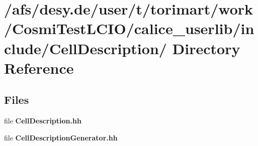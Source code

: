 \section{/afs/desy.de/user/t/torimart/work/CosmiTestLCIO/calice\_\-userlib/include/CellDescription/ Directory Reference}
\label{dir_0752f43a598844ab2c2785427086bead}
\subsection*{Files}
\begin{DoxyCompactItemize}
\item 
file {\bfseries CellDescription.hh}
\item 
file {\bfseries CellDescriptionGenerator.hh}
\end{DoxyCompactItemize}
